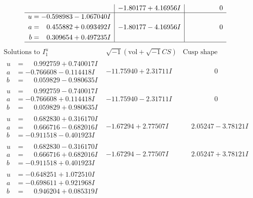 \documentclass[1p]{elsarticle_modified}
\theoremstyle{definition}
\newcommand{\I}{\sqrt{-1}}
\begin{document}
$$\begin{array}{c|c|c}
 & -1.80177 + 4.16956 I & \phantom{-0.000000 } 0 \\ \hline\begin{aligned}
u &= -0.598983 - 1.067040 I \\
a &= \phantom{-}0.455882 + 0.093492 I \\
b &= \phantom{-}0.309654 + 0.497235 I\end{aligned}
 & -1.80177 - 4.16956 I & \phantom{-0.000000 } 0\\
 \hline 
 \end{array}$$\newpage$$\begin{array}{c|c|c}  
\text{Solutions to }I^u_{1}& \I (\text{vol} + \sqrt{-1}CS) & \text{Cusp shape}\\
 \hline 
\begin{aligned}
u &= \phantom{-}0.992759 + 0.740017 I \\
a &= -0.766608 - 0.114418 I \\
b &= \phantom{-}0.059829 - 0.980635 I\end{aligned}
 & -11.75940 + 2.31711 I & \phantom{-0.000000 } 0 \\ \hline\begin{aligned}
u &= \phantom{-}0.992759 - 0.740017 I \\
a &= -0.766608 + 0.114418 I \\
b &= \phantom{-}0.059829 + 0.980635 I\end{aligned}
 & -11.75940 - 2.31711 I & \phantom{-0.000000 } 0 \\ \hline\begin{aligned}
u &= \phantom{-}0.682830 + 0.316170 I \\
a &= \phantom{-}0.666716 - 0.682016 I \\
b &= -0.911518 - 0.401923 I\end{aligned}
 & -1.67294 + 2.77507 I & \phantom{-}2.05247 - 3.78121 I \\ \hline\begin{aligned}
u &= \phantom{-}0.682830 - 0.316170 I \\
a &= \phantom{-}0.666716 + 0.682016 I \\
b &= -0.911518 + 0.401923 I\end{aligned}
 & -1.67294 - 2.77507 I & \phantom{-}2.05247 + 3.78121 I \\ \hline\begin{aligned}
u &= -0.648251 + 1.072510 I \\
a &= -0.698611 + 0.921968 I \\
b &= \phantom{-}0.946204 + 0.085319 I\end{aligned}

\end{array}$$
\end{document}
